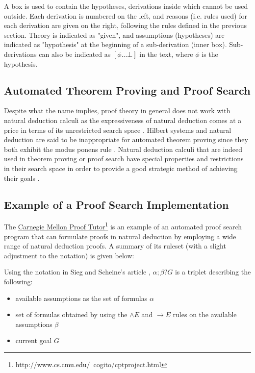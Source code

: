 \documentclass[11pt,twoside,a4paper]{report}
\begin{document}
A box is used to contain the hypotheses, derivations inside which cannot be used outside. Each derivation is numbered on the left, and reasons (i.e. rules used) for each derivation are given on the right, following the rules defined in the previous section. Theory is indicated as "given", and assumptions (hypotheses) are indicated as "hypothesis" at the beginning of a sub-derivation (inner box). Sub-derivations can also be indicated as $[\phi ... \bot]$ in the text, where $\phi$ is the hypothesis.

\subsection{Automated Theorem Proving and Proof Search}
\label{subsec:nnd}
Despite what the name implies, proof theory in general does not work with natural deduction calculi as the expressiveness of natural deduction comes at a price in terms of its unrestricted search space \citep*[pp. 140-141]{siegfried}. Hilbert systems and natural deduction are said to be inappropriate for automated theorem proving since they both exhibit the modus ponens rule \citep*[p. 95]{autobots}. Natural deduction calculi that are indeed used in theorem proving or proof search have special properties and restrictions in their search space in order to provide a good strategic method of achieving their goals \citep*[pp. 140-141]{siegfried}.

\subsection{Example of a Proof Search Implementation}
\label{subsec:carnage}
The \href{http://www.cs.cmu.edu/~cogito/cptproject.html}{Carnegie Mellon Proof Tutor}\footnote{http://www.cs.cmu.edu/~cogito/cptproject.html} is an example of an automated proof search program that can formulate proofs in natural deduction by employing a wide range of natural deduction proofs. A summary of its ruleset (with a slight adjustment to the notation) is given below:

Using the notation in Sieg and Scheine's article \citep{siegfried}, $\alpha;\beta?G$ is a triplet describing the following:
\begin{itemize}
\item
available assumptions as the set of formulas $\alpha$
\item
set of formulas obtained by using the $\wedge E$ and $\rightarrow E$ rules on the available assumptions $\beta$
\item
current goal $G$
\end{itemize}
\end{document}
